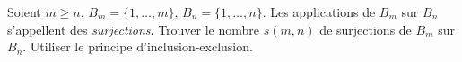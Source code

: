 Soient $m \geq n$, $B_m = \{1, \ldots, m\}$, $B_n = \{1, \ldots, n\}$. Les applications de $B_m$ sur $B_n$ s'appellent des \emph{surjections}. Trouver le nombre $s(m, n)$ de surjections de $B_m$ sur $B_n$. Utiliser le principe d'inclusion-exclusion.
